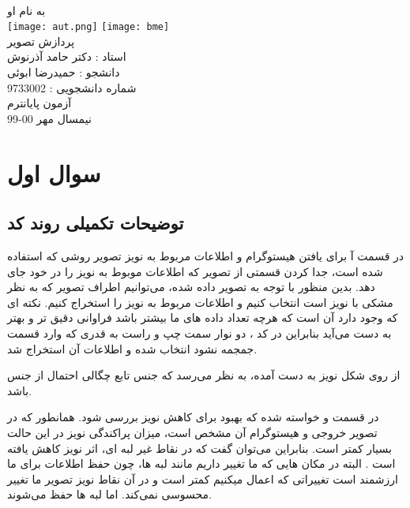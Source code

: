 \documentclass[12pt]{article}
\begin{document}
	\doublespacing
	\begin{titlepage}
		\paragraph*{}
		\centering
			
			
			{\small به نام او}\\
			\vspace{1cm}
			\texttt{[image: aut.png]}
			\hspace{2.5cm}
			\hspace{2.5cm}
			\texttt{[image: bme]}\\
			\vspace{2cm}
			{\Huge پردازش تصویر}\\
			\vspace{2cm}
			{\large استاد : دکتر حامد آذرنوش}\\
			\vspace{0.5cm}
			{\small  دانشجو :‌ حمیدرضا ابوئی}\\
			\vspace{0.5cm}
			{\small شماره دانشجویی : 9733002}\\
			\vspace{0.5cm}
			{\small آزمون پایانترم}\\
			\vfill
			{\tiny نیمسال مهر 00-99}
	\end{titlepage}
	\thispagestyle{plain}
	\tableofcontents
	\newpage
	\doublespacing
	\section{سوال اول}
		\subsection{توضیحات تکمیلی روند کد}
			در قسمت آ برای یافتن هیستوگرام و اطلاعات مربوط به نویز تصویر روشی که استفاده شده است، جدا کردن قسمتی از تصویر که اطلاعات موبوط به نویز را در خود جای دهد. بدین منظور با توجه به تصویر داده شده، می‌توانیم اطراف تصویر که به نظر مشکی با نویز است انتخاب کنیم و اطلاعات مربوط به نویز را استخراج کنیم. نکته ای که وجود دارد آن است که هرچه تعداد داده های ما بیشتر باشد فراوانی دقیق تر و بهتر به دست می‌آید بنابراین در کد ، دو نوار سمت چپ و راست به قدری که وارد قسمت جمجمه نشود انتخاب شده و اطلاعات آن استخراج شد.
			
			از روی شکل نویز به دست آمده، به نظر می‌رسد که جنس تابع چگالی احتمال از جنس 
			باشد.
			
			در قسمت و خواسته شده که بهبود برای کاهش نویز بررسی شود. همانطور که در تصویر خروجی و هیستوگرام آن مشخص است، میزان پراکندگی نویز در این حالت بسیار کمتر است. بنابراین می‌توان گفت که در نقاط غیر لبه ای، اثر نویز کاهش یافته است . البته در مکان هایی که ما تغییر داریم مانند لبه ها، چون حفظ اطلاعات برای ما ارزشمند است تغییراتی که اعمال میکنیم کمتر است و در آن نقاط نویز تصویر ما تغییر محسوسی نمی‌کند. اما لبه ها حفظ می‌شوند.
			
\end{document}
